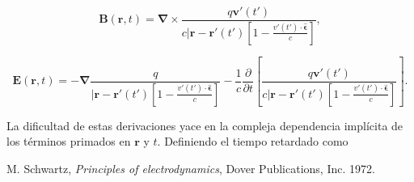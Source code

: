 \documentclass[a4paper,11pt]{article}
\numberwithin{equation}{section}
\begin{document}
\begin{equation}
 \mathbf{B}(\mathbf{r},t) = 
 \pmb{\nabla} \times \frac{q\mathbf{v}'(t')}{c|\mathbf{r}-\mathbf{r}'(t')\left[1 - 
 \frac{v'(t')\cdot \hat{\mathbf{\epsilon}}}{c}\right]},
\end{equation}

\begin{equation}
 \mathbf{E}(\mathbf{r},t) = - \pmb{\nabla}  \frac{q}{|\mathbf{r}-\mathbf{r}'(t')\left[1 - 
 \frac{v'(t')\cdot \hat{\mathbf{\epsilon}}}{c}\right]} - \frac{1}{c} 
 \frac{\partial}{\partial t}\left[\frac{q\mathbf{v}'(t')}{c|\mathbf{r}-\mathbf{r}'(t')\left[1 - 
 \frac{v'(t')\cdot \hat{\mathbf{\epsilon}}}{c}\right]} \right].
\end{equation}

La dificultad de estas derivaciones yace en la compleja dependencia implícita 
de los términos primados en $\mathbf{r}$ y $t$. Definiendo el tiempo retardado 
como 








\begin{thebibliography}{10}
 M. Schwartz, \emph{Principles of electrodynamics}, Dover Publications, Inc. 1972.
\end{thebibliography}
\end{document}
